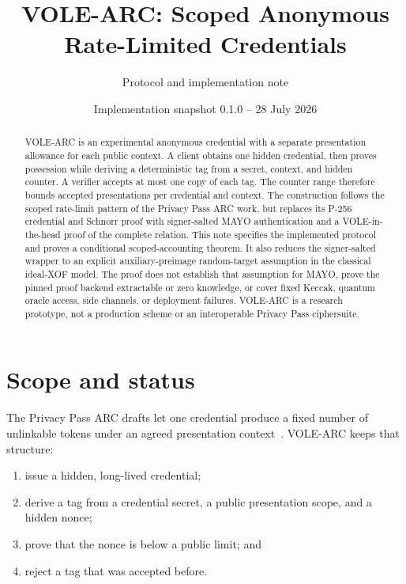 \documentclass[11pt]{article}
\title{\textbf{VOLE-ARC: Scoped Anonymous Rate-Limited Credentials}}
\author{Protocol and implementation note}
\date{Implementation snapshot 0.1.0 -- 28 July 2026}
\theoremstyle{remark}
\begin{document}
\maketitle

\begin{abstract}
VOLE-ARC is an experimental anonymous credential with a separate presentation
allowance for each public context. A client obtains one hidden credential,
then proves possession while deriving a deterministic tag from a secret,
context, and hidden counter. A verifier accepts at most one copy of each tag.
The counter range therefore bounds accepted presentations per credential and
context. The construction follows the scoped rate-limit pattern of the
Privacy Pass ARC work, but replaces its P-256 credential and Schnorr proof
with signer-salted MAYO authentication and a VOLE-in-the-head proof of the
complete relation. This note specifies the implemented protocol and proves a
conditional scoped-accounting theorem. It also reduces the signer-salted
wrapper to an explicit auxiliary-preimage random-target assumption in the
classical ideal-XOF model. The proof does not establish that assumption for
MAYO, prove the pinned proof backend extractable or zero knowledge, or cover
fixed Keccak, quantum oracle access, side channels, or deployment failures.
VOLE-ARC is a research prototype, not a production scheme or an interoperable
Privacy Pass ciphersuite.
\end{abstract}

\tableofcontents
\newpage

\section{Scope and status}

The Privacy Pass ARC drafts let one credential produce a fixed number of
unlinkable tokens under an agreed presentation
context~\cite{arc-crypto,arc-protocol}. VOLE-ARC keeps that structure:

\begin{enumerate}
  \item issue a hidden, long-lived credential;
  \item derive a tag from a credential secret, a public presentation scope,
        and a hidden nonce;
  \item prove that the nonce is below a public limit; and
  \item reject a tag that was accepted before.
\end{enumerate}
\end{document}
